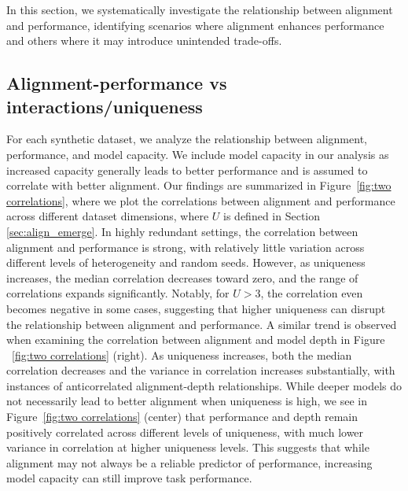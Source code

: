 In this section, we systematically investigate the relationship between alignment and performance, identifying scenarios where alignment enhances performance and others where it may introduce unintended trade-offs.

\subsection{Alignment-performance vs interactions/uniqueness}
For each synthetic dataset, we analyze the relationship between alignment, performance, and model capacity. We include model capacity in our analysis as increased capacity generally leads to better performance and is assumed to correlate with better alignment. Our findings are summarized in Figure~\ref{fig:two correlations}, where we plot the correlations between alignment and performance across different dataset dimensions, where $U$ is defined in Section \ref{sec:align_emerge}. In highly redundant settings, the correlation between alignment and performance is strong, with relatively little variation across different levels of heterogeneity and random seeds. However, as uniqueness increases, the median correlation decreases toward zero, and the range of correlations expands significantly. Notably, for \( U > 3 \), the correlation even becomes negative in some cases, suggesting that higher uniqueness can disrupt the relationship between alignment and performance. A similar trend is observed when examining the correlation between alignment and model depth in Figure ~\ref{fig:two correlations} (right). As uniqueness increases, both the median correlation decreases and the variance in correlation increases substantially, with instances of anticorrelated alignment-depth relationships. While deeper models do not necessarily lead to better alignment when uniqueness is high, we see in Figure~\ref{fig:two correlations} (center) that performance and depth remain positively correlated across different levels of uniqueness, with much lower variance in correlation at higher uniqueness levels. This suggests that while alignment may not always be a reliable predictor of performance, increasing model capacity can still improve task performance. 

